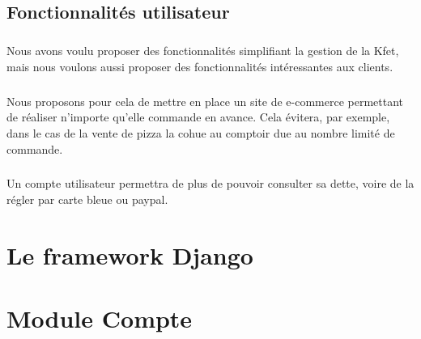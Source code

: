 \documentclass[twoside,UTF8]{EPURapport}
\begin{document}
    \section{Fonctionnalités utilisateur}

        \paragraph{}Nous avons voulu proposer des fonctionnalités simplifiant la gestion de la Kfet, mais nous voulons aussi proposer des fonctionnalités intéressantes aux clients.

        \paragraph{}Nous proposons pour cela de mettre en place un site de e-commerce permettant de réaliser n'importe qu'elle commande en avance. Cela évitera, par exemple, dans le cas de la vente de pizza la cohue au comptoir due au nombre limité de commande.

        \paragraph{}Un compte utilisateur permettra de plus de pouvoir consulter sa dette, voire de la régler par carte bleue ou paypal.
        


\chapter{Le framework Django}

\chapter{Module Compte}

\end{document}
